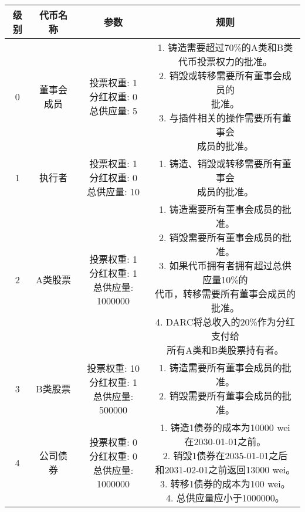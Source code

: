 \documentclass[main.tex]{subfiles}
\begin{document}
\begin{table}[h!]
    \centering
    \begin{tabular}{| c | c | c| c |} 
        \hline
        级别 & 代币名称 & 参数 & 规则 \\ [0.5ex] 
        \hline\hline
    0 & 董事会成员 & \makecell[l]{投票权重: 1 \\ 分红权重: 0 \\ 总供应量: 5} & \makecell[l]{1. 铸造需要超过70\%的A类和B类\\ 代币投票权力的批准。 \\ 2. 销毁或转移需要所有董事会成员的\\ 批准。 \\ 3. 与插件相关的操作需要所有董事会\\ 成员的批准。} \\
    \hline 
    1 & 执行者  & \makecell[l]{投票权重: 1 \\ 分红权重: 0 \\ 总供应量: 10} & \makecell[l]{1. 铸造、销毁或转移需要所有董事会\\ 成员的批准。} \\
    \hline
    2 & A类股票 & \makecell[l]{投票权重: 1 \\ 分红权重: 1 \\ 总供应量: 1000000} & \makecell[l]{1. 铸造需要所有董事会成员的批准。 \\ 2. 销毁需要所有董事会成员的批准。 \\ 3. 如果代币拥有者拥有超过总供应量10\%的\\ 代币，转移需要所有董事会成员的批准。 \\ 4. DARC将总收入的20\%作为分红支付给\\ 所有A类和B类股票持有者。} \\
    \hline
    3 & B类股票 & \makecell[l]{投票权重: 10 \\ 分红权重: 1 \\ 总供应量: 500000} & \makecell[l]{1. 铸造需要所有董事会成员的批准。 \\ 2. 销毁需要所有董事会成员的批准。} \\
    \hline
    4 & 公司债券 & \makecell[l]{投票权重: 0 \\ 分红权重: 0 \\ 总供应量: 1000000} & \makecell[l]{1. 铸造1债券的成本为10000 wei \\ 在2030-01-01之前。 \\ 2. 销毁1债券在2035-01-01之后\\ 和2031-02-01之前返回13000 wei。 \\ 3. 转移1债券的成本为100 wei。 \\ 4. 总供应量应小于1000000。} \\

\end{tabular}
\end{table}
\end{document}
